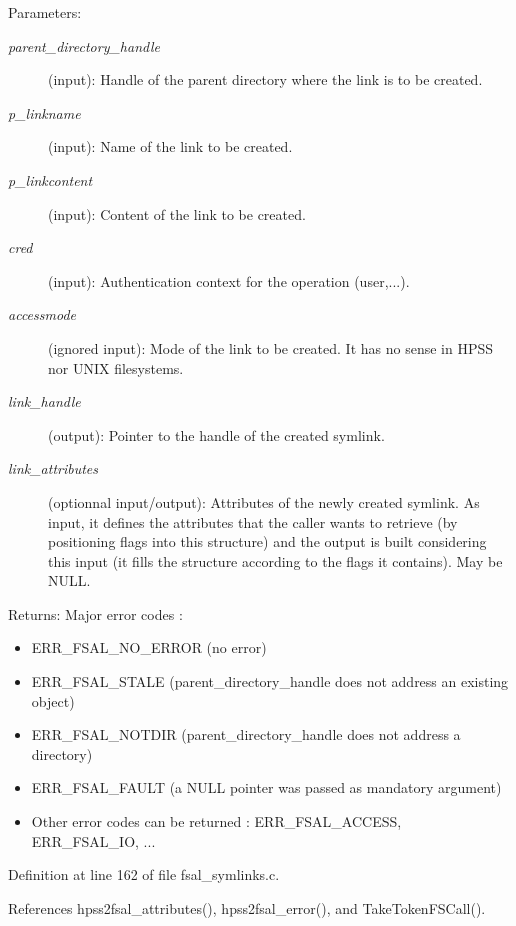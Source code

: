 \begin{Desc}
\item[Parameters:]
\begin{description}
\item[{\em parent\_\-directory\_\-handle}](input): Handle of the parent directory where the link is to be created. \item[{\em p\_\-linkname}](input): Name of the link to be created. \item[{\em p\_\-linkcontent}](input): Content of the link to be created. \item[{\em cred}](input): Authentication context for the operation (user,...). \item[{\em accessmode}](ignored input): Mode of the link to be created. It has no sense in HPSS nor UNIX filesystems. \item[{\em link\_\-handle}](output): Pointer to the handle of the created symlink. \item[{\em link\_\-attributes}](optionnal input/output): Attributes of the newly created symlink. As input, it defines the attributes that the caller wants to retrieve (by positioning flags into this structure) and the output is built considering this input (it fills the structure according to the flags it contains). May be NULL.\end{description}
\end{Desc}
\begin{Desc}
\item[Returns:]Major error codes :\begin{itemize}
\item ERR\_\-FSAL\_\-NO\_\-ERROR (no error)\item ERR\_\-FSAL\_\-STALE (parent\_\-directory\_\-handle does not address an existing object)\item ERR\_\-FSAL\_\-NOTDIR (parent\_\-directory\_\-handle does not address a directory)\item ERR\_\-FSAL\_\-FAULT (a NULL pointer was passed as mandatory argument)\item Other error codes can be returned : ERR\_\-FSAL\_\-ACCESS, ERR\_\-FSAL\_\-IO, ... \end{itemize}
\end{Desc}


Definition at line 162 of file fsal\_\-symlinks.c.

References hpss2fsal\_\-attributes(), hpss2fsal\_\-error(), and TakeTokenFSCall().